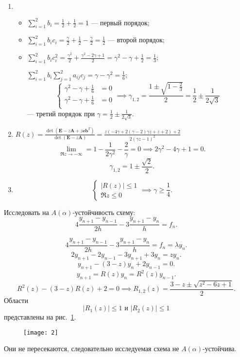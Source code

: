 \documentclass[a4paper]{article}
\begin{document}
\begin{sol}
\begin{enumerate}
	\item 
\begin{itemize}
\item $\displaystyle  \sum_{i=1}^{2} b_i= \frac{1}{2}+\frac{1}{2}=1$ --- первый порядок;
\item $\displaystyle \sum_{i=1}^{2} b_i c_i=
	\frac{\gamma}{2}+\frac{1}{2}-\frac{\gamma}{2}=\frac{1}{2}$ --- второй порядок;
\item $\displaystyle \sum_{i=1}^{2} b_i c_i^2=
	\frac{\gamma^2}{2}+ \frac{\gamma^2-2\gamma
	+1}{2}=\gamma^2-\gamma +\frac{1}{2}=\frac{1}{3}$;

	$\displaystyle 
	\sum_{i=1}^{2} b_i \sum_{j=1}^{2} a_{ij}
	c_j= \gamma-\gamma^2=\frac{1}{6}$;
	\[
	\left\{
	\begin{aligned}
	\gamma^2-\gamma+\frac{1}{6}&= 0 \\
	\gamma^2-\gamma+\frac{1}{6}&= 0 \\
	\end{aligned}
	\right.
	\implies \gamma_{1,2}=
	\frac{1\pm \sqrt{1-\frac{2}{3}} }{2}=
	\frac{1}{2}\pm \frac{1}{2 \sqrt{3} }
	\] --- третий порядок при $\displaystyle \gamma=\frac{1}{2}\pm \frac{1}{2 \sqrt{3} }$. 
\end{itemize}
\item $\displaystyle R(z)= \frac{\det \left( 
	\mathbf{E}-z\mathbf{A}+z \mathbf{e}
	\mathbf{b}^T\right) }{\det
(\mathbf{E}-z \mathbf{A})}=\frac{z (-4 \gamma +2 (\gamma -2) \gamma  z+z+2)+2}{2 (\gamma  z-1)^2}$
\[
\lim_{\Re z \to -\infty} =1-\frac{1}{2\gamma^2}-
\frac{2}{\gamma}=0\implies
2\gamma^2-4\gamma +1=0
.\] 
\[
\gamma_{1,2}= 1\pm \frac{\sqrt{2} }{2}
.\] 
\item \[
\left\{
\begin{aligned}
	|R(z)|\le 1\\
	\Re  z\le 0
\end{aligned}
\right.
\implies \gamma \ge \frac{1}{4}
.\] 
\end{enumerate}
\end{sol}
\begin{hiProb}[7.12]
	Исследовать на $A(\alpha)$-устойчивость
	схему:
	\[
	4 \frac{y_{n+1}-y_{n-1}}{2h}-
	3 \frac{y_{n+1}-y_n}{h}=f_n
	.\] 
\end{hiProb}
\begin{sol}
\[
4 \frac{y_{n+1}-y_{n-1}}{2h}-3 \frac{y_{n+1}-y_n}{h}=f_n=\lambda y_n
.\] 
\[
2y_{n+1}-2y_{n-1}- 3 y_{n+1}+3 y_n=zy_n
.\] 
\[
	y_{n+1}-(3-z)y_n+2 y_{n-1}=0
.\] 
\[
	y_{n+1}=R(z)y_n=R^2(z)y_{n-1}
.\] 
\[
	R^2(z)-(3-z)R(z)+2=0\implies
	R_{1,2}(z)= \frac{3-z \pm \sqrt{z^2-6z+1} }{2}
.\] 
Области
\[
	|R_1(z)|\le 1 \text{ и } |R_2(z)|\le 1
\]
представлены на рис.~\ref{fig:2}.
\begin{figure}[htpb]
	\centering
	\texttt{[image: 2]}
	\caption{}
	\label{fig:2}
\end{figure}
Они не пересекаются, следовательно исследуемая схема
не $A(\alpha)$-устойчива.
\end{sol}
\end{document}

